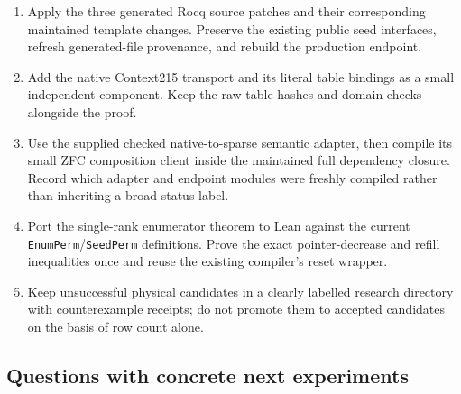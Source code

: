 \documentclass[11pt]{article}
\newcommand{\code}[1]{\texttt{#1}}
\begin{document}
\begin{enumerate}
\item Apply the three generated Rocq source patches and their corresponding maintained template changes. Preserve the existing public seed interfaces, refresh generated-file provenance, and rebuild the production endpoint.
\item Add the native Context215 transport and its literal table bindings as a small independent component. Keep the raw table hashes and domain checks alongside the proof.
\item Use the supplied checked native-to-sparse semantic adapter, then compile its small ZFC composition client inside the maintained full dependency closure. Record which adapter and endpoint modules were freshly compiled rather than inheriting a broad status label.
\item Port the single-rank enumerator theorem to Lean against the current \code{EnumPerm}/\code{SeedPerm} definitions. Prove the exact pointer-decrease and refill inequalities once and reuse the existing compiler's reset wrapper.
\item Keep unsuccessful physical candidates in a clearly labelled research directory with counterexample receipts; do not promote them to accepted candidates on the basis of row count alone.
\end{enumerate}

\subsection{Questions with concrete next experiments}
\end{document}
